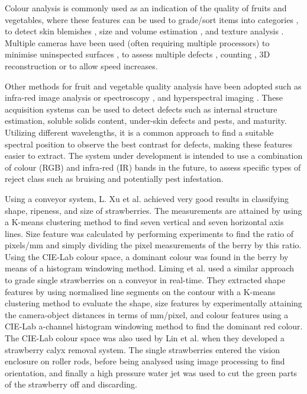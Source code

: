 \documentclass[fleqn,twoside,12pt]{report}
\begin{document}
Colour analysis is commonly used as an indication of the quality of fruits and vegetables, where these features can be used to grade/sort items into categories \cite{jun, elmasry3}, to detect skin blemishes \cite{blasco3, leemans}, size and volume estimation \cite{bundit, elmasry3}, and texture analysis \cite{jun, rakun}. Multiple cameras have been used (often requiring multiple processors) to minimise uninspected surfaces \cite{zouxiao, qingzhong}, to assess multiple defects \cite{blasco4}, counting \cite{song}, 3D reconstruction \cite{panitnat} or to allow speed increases\cite{reece}.   

Other methods for fruit and vegetable quality analysis have been adopted such as infra-red image analysis or spectroscopy \cite{guthrie, bureau, yande}, and hyperspectral imaging \cite{renfu} \cite{jianwei, mendoza, rajkumar}. These acquisition systems can be used to detect defects such as internal structure estimation, soluble solids content, under-skin defects and pests, and maturity. Utilizing different wavelengths, it is a common approach to find a suitable spectral position to observe the best contrast for defects, making these features easier to extract\cite{ariana, piotr}. The system under development is intended to use a combination of colour (RGB) and infra-red (IR) bands in the future, to assess specific types of reject class such as bruising and potentially pest infestation. 

Using a conveyor system, L. Xu et al.\cite{xu} achieved very good results in classifying shape, ripeness, and size of strawberries. The measurements are attained by using a K-means clustering method to find seven vertical and seven horizontal axis lines. Size feature was calculated by performing experiments to find the ratio of pixels/mm and simply dividing the pixel measurements of the berry by this ratio. Using the CIE-Lab colour space, a dominant colour was found in the berry by means of a histogram windowing method. Liming et al.\cite{liming} used a similar approach to grade single strawberries on a conveyor in real-time. They extracted shape features by using normalised line segments on the contour with a K-means clustering method to evaluate the shape, size features by experimentally attaining the camera-object distances in terms of mm/pixel, and colour features using a CIE-Lab a-channel histogram windowing method to find the dominant red colour. The CIE-Lab colour space was also used by Lin et al.\cite{lin} when they developed a strawberry calyx removal system. The single strawberries entered the vision enclosure on roller rods, before being analysed using image processing to find orientation, and finally a high pressure water jet was used to cut the green parts of the strawberry off and discarding.
\end{document}
